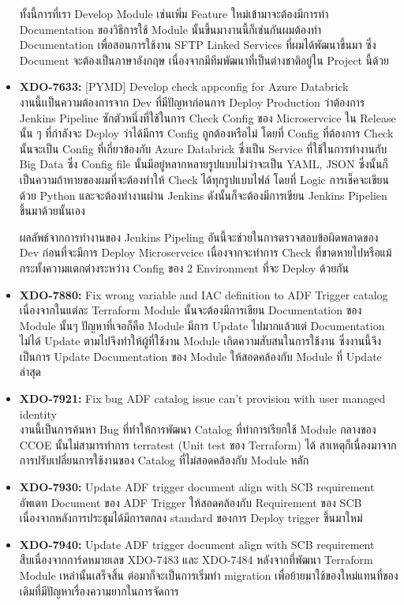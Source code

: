 \begin{itemize}
            ทั้งนี้การที่เรา Develop Module เช่นเพิ่ม Feature ใหม่เข้ามาจะต้องมีการทำ Documentation ของวิธีการใช้ Module นั้นขึ้นมางานนี้ก็เช่นกันผมต้องทำ Documentation เพื่อสอนการใช้งาน SFTP Linked Services ที่ผมได้พัฒนาขึ้นมา ซึ่ง Document จะต้องเป็นภาษาอังกฤษ เนื่องจากมีทีมพัฒนาที่เป็นต่างชาติอยู่ใน Project นี้ด้วย
      \item \textbf{XDO-7633:} [PYMD] Develop check appconfig for Azure Databrick\\
            งานนี้เเป็นความต้องการจาก Dev ที่มีปัญหาก่อนการ Deploy Production ว่าต้องการ Jenkins Pipeline ซักตัวหนึ่งที่ใช้ในการ Check Config ของ Microservcice ใน Release นั้น ๆ ที่กำลังจะ Deploy ว่าได้มีการ Config ถูกต้องหรือไม่ โดยที่ Config ที่ต้องการ Check นั้นจะเป็น Config ที่เกี่ยวข้องกับ Azure Databrick ซึ่งเป็น Service ที่ใช้ในการทำงานกับ Big Data ซึ่ง Config file นั้นมีอยู๋หลากหลายรูปแบบไม่ว่าจะเป็น YAML, JSON ซึ่งนั้นก็เป็นความถ้าทายของผมที่จะต้องทำให้ Check ได้ทุกรูปแบบไฟล์ โดยที่ Logic การเช็คจะเขียนด้วย Python และจะต้องทำงานผ่าน Jenkins ดังนั้นก็จะต้องมีการเขียน Jenkins Pipelien ขึ้นมาด้วยนั้นเอง

            ผลลัพธ์จากการทำงานของ Jenkins Pipeling อันนี้จะช่วยในการตรวจสอบข้อผิดพลาดของ Dev ก่อนที่จะมีการ Deploy Microservcice เนื่องจากจะทำการ Check ที่ขาดหายไปหรือแม้กระทั้งความแตกต่างระหว่าง Config ของ 2 Environment ที่จะ Deploy ด้วยกัน
      \item \textbf{XDO-7880:} Fix wrong variable and IAC definition to ADF Trigger catalog\\
            เนื่องจากในแต่ละ Terraform Module นั้นจะต้องมีการเขียน Documentation ของ Module นั้นๆ ปัญหาที่เจอก็คือ Module มีการ Update ไปมากแล้วแต่ Documentation ไม่ได้ Update ตามไปจึงทำให้ผู้ที่ใช้งาน Module เกิดความสับสนในการใช้งาน ซึ่งงานนี้จึงเป็นการ Update Documentation ของ Module ให้สอดคล้องกับ Module ที่ Update ล่าสุด
      \item \textbf{XDO-7921:} Fix bug ADF catalog issue can't provision with user managed identity\\
            งานนี้เป็นการค้นหา Bug ที่ทำให้การพัฒนา Catalog ที่ทำการเรียกใช้ Module กลางของ CCOE นั้นไม่สามารทำการ terratest (Unit test ของ Terraform) ได้ สาเหตุก็เนื่องมาจากการปรับเปลี่ยนการใช้งานของ Catalog ที่ไม่สอดคล้องกับ Module หลัก
      \item \textbf{XDO-7930:} Update ADF trigger document align with SCB requirement\\
            อัพเดท Document ของ ADF Trigger ให้สอดคล้องกับ Requirement ของ SCB เนื่องจากหลังการประชุมได้มีการตกลง standard ของการ Deploy trigger ขึ้นมาใหม่
      \item \textbf{XDO-7940:} Update ADF trigger document align with SCB requirement\\
            สืบเนื่องจากการ์ดหมายเลข XDO-7483 และ XDO-7484 หลังจากที่พัฒนา Terraform Module เหล่านั้นเสร็จสิ้น ต่อมาก็จะเป็นการเริ่มทำ migration เพื่อย้ายมาใช้ของใหม่แทนที่ของเดิมที่มีปัญหาเรื่องความยากในการจัดการ
\end{itemize}


